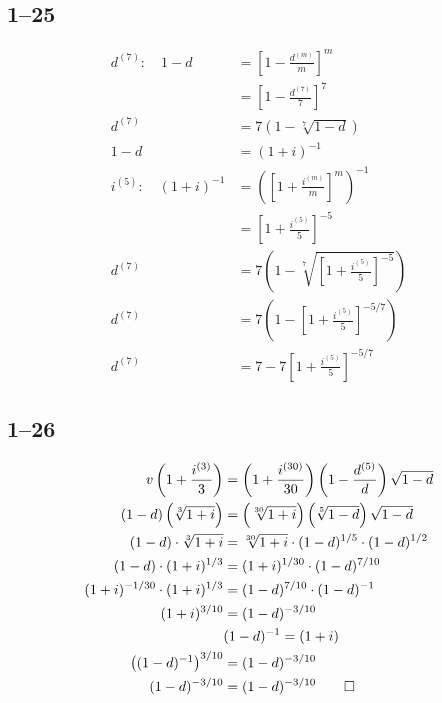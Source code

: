 \documentclass[a4paper, 12pt, reqno]{amsart}
\numberwithin{equation}{section}
\begin{document}
\subsection*{1--25}

\begin{equation}\nonumber
    \begin{aligned}
        d^{(7)}: \quad 1-d &= \left[ 1 - \frac{d^{(m)}}{m} \right]^m    \\
        &= \left[ 1 - \frac{d^{(7)}}{7} \right]^7                       \\
        d^{(7)} &= 7\left(1-\sqrt[7]{1-d}\right)                        \\
        1-d &= (1+i)^{-1}                                               \\
        i^{(5)}: \quad (1+i)^{-1} &= \left( \left[ 1 + \frac{i^{(m)}}{m}
            \right]^m\right)^{-1}                           \\
        &= \left[ 1 + \frac{i^{(5)}}{5} \right]^{-5}        \\
        d^{(7)} &= 7\left(1-\sqrt[7]{\left[ 1 + \frac{i^{(5)}}{5} \right]^{-5}}
            \right)\\
        d^{(7)} &= 7\left(1-\left[ 1 + \frac{i^{(5)}}{5} \right]^{-5/7}\right)\\
        d^{(7)} &= 7-7\left[ 1 + \frac{i^{(5)}}{5} \right]^{-5/7}
    \end{aligned}
\end{equation}

\subsection*{1--26}

\begin{equation}\nonumber
    \begin{aligned}
        v \left( 1 + \frac{i^{(3)}}{3} \right) &= \left( 1 + \frac{i^{(30)}}{30}
            \right) \left( 1 - \frac{d^{(5)}}{d} \right) \sqrt{1-d}     \\
        (1-d) \left( \sqrt[3]{1+i} \right) &= \left( \sqrt[30]{1+i} \right)
            \left( \sqrt[5]{1-d} \right) \sqrt{1-d}                     \\
        (1-d) \cdot \sqrt[3]{1+i} &= \sqrt[30]{1+i} \cdot (1-d)^{1/5} \cdot
            (1-d)^{1/2}                                                 \\
        (1-d) \cdot (1+i)^{1/3} &= (1+i)^{1/30} \cdot (1-d)^{7/10}      \\
        (1+i)^{-1/30} \cdot (1+i)^{1/3} &= (1-d)^{7/10} \cdot (1-d)^{-1} \\
        (1+i)^{3/10} &= (1-d)^{-3/10}                                   \\
        \quad & (1-d)^{-1} = (1+i)                                      \\
        \left( (1-d)^{-1} \right)^{3/10} &= (1-d)^{-3/10}               \\
        (1-d)^{-3/10} &= (1-d)^{-3/10}  \qed
    \end{aligned}
\end{equation}
\end{document}

